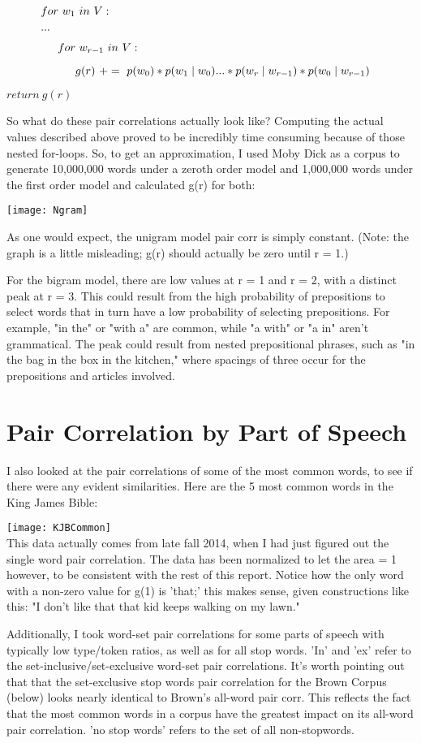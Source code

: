 \documentclass[11pt,letterpaper]{article}
\theoremstyle{definition}
\begin{document}
$\indent \indent for\ w_1\ in\ V:$

$\indent \indent ...$

$\indent \indent \indent for\ w_{r-1}\ in\ V:$

$\indent \indent \indent \indent g(r)\ +=\ p(w_0) * p(w_1 \mid w_0) ... * p(w_r \mid w_{r-1}) * p(w_0 \mid w_{r-1})$

$return\ g(r)$
\[\]

So what do these pair correlations actually look like? Computing the actual values described above proved to be incredibly time consuming because of those nested for-loops. So, to get an approximation, I used Moby Dick as a corpus to generate 10,000,000 words under a zeroth order model and 1,000,000 words under the first order model and calculated g(r) for both:

\texttt{[image: Ngram]}

As one would expect, the unigram model pair corr is simply constant. (Note: the graph is a little misleading; g(r) should actually be zero until r = 1.)

For the bigram model, there are low values at r = 1 and r = 2, with a distinct peak at r = 3. This could result from the high probability of prepositions to select words that in turn have a low probability of selecting prepositions. For example, "in the" or "with a" are common, while "a with" or "a in" aren't grammatical. The peak could result from nested prepositional phrases, such as "in the bag in the box in the kitchen," where spacings of three occur for the prepositions and articles involved.

\section{Pair Correlation by Part of Speech}

I also looked at the pair correlations of some of the most common words, to see if there were any evident similarities. Here are the 5 most common words in the King James Bible:

\texttt{[image: KJBCommon]}
\[\]
This data actually comes from late fall 2014, when I had just figured out the single word pair correlation. The data has been normalized to let the area = 1 however, to be consistent with the rest of this report. Notice how the only word with a non-zero value for g(1) is 'that;' this makes sense, given constructions like this: "I don't like that that kid keeps walking on my lawn." 

Additionally, I took word-set pair correlations for some parts of speech with typically low type/token ratios, as well as for all stop words. 'In' and 'ex' refer to the set-inclusive/set-exclusive word-set pair correlations. It's worth pointing out that that the set-exclusive stop words pair correlation for the Brown Corpus (below) looks nearly identical to Brown's all-word pair corr. This reflects the fact that the most common words in a corpus have the greatest impact on its all-word pair correlation. 'no stop words' refers to the set of all non-stopwords.
\end{document}
